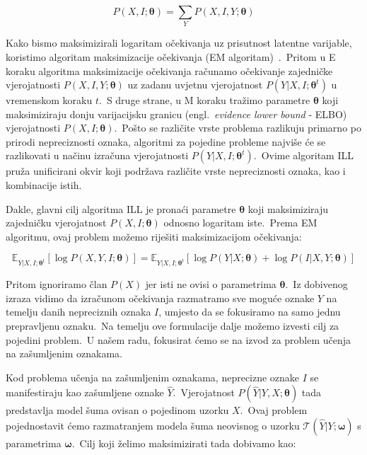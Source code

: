 \documentclass[diplomskirad]{fer}
\begin{document}
\begin{equation}
  P(X, I; \bm{\theta}) = \sum_{Y} P(X, I, Y; \bm{\theta})
  \label{eq:ill_joint}
\end{equation}

Kako bismo maksimizirali logaritam očekivanja uz prisutnost latentne varijable, koristimo algoritam maksimizacije očekivanja (EM algoritam)~\cite{moon1996expectation}.\
Pritom u E koraku algoritma maksimizacije očekivanja računamo očekivanje zajedničke vjerojatnosti $P(X, I, Y; \bm{\theta})$ uz zadanu uvjetnu vjerojatnost $P(Y | X, I; \bm{\theta}^t)$ u vremenskom koraku $t$.\ 
S druge strane, u M koraku tražimo parametre $\bm{\theta}$ koji maksimiziraju donju varijacijsku granicu (engl.\ \textit{evidence lower bound} - ELBO) vjerojatnosti $P(X, I; \bm{\theta})$.\ 
Pošto se različite vrste problema razlikuju primarno po prirodi nepreciznosti oznaka, algoritmi za pojedine probleme najviše će se razlikovati u načinu izračuna vjerojatnosti $P(Y | X, I; \bm{\theta}^t)$.\
Ovime algoritam ILL pruža unificirani okvir koji podržava različite vrste nepreciznosti oznaka, kao i kombinacije istih.\

Dakle, glavni cilj algoritma ILL je pronaći parametre $\bm{\theta}$ koji maksimiziraju zajedničku vjerojatnost $P(X, I; \bm{\theta})$ odnosno logaritam iste.\
Prema EM algoritmu, ovaj problem možemo riješiti maksimizacijom očekivanja:

\begin{equation}
  \mathbb{E}_{Y | X, I; \bm{\theta}^t} \left[ \log P(X, Y, I; \bm{\theta}) \right] = \mathbb{E}_{Y | X, I; \bm{\theta}^t} \left[ \log P(Y | X; \bm{\theta}) + \log P(I | X, Y; \bm{\theta}) \right]
  \label{eq:ill_expectation}
\end{equation}

\pagebreak

Pritom ignoriramo član $P(X)$ jer isti ne ovisi o parametrima $\bm{\theta}$.\ Iz dobivenog izraza vidimo da izračunom očekivanja razmatramo sve moguće oznake $Y$ na temelju danih nepreciznih oznaka $I$, umjesto da se fokusiramo na samo jednu prepravljenu oznaku.\
Na temelju ove formulacije dalje možemo izvesti cilj za pojedini problem.\ U našem radu, fokusirat ćemo se na izvod za problem učenja na zašumljenim oznakama.\ 

Kod problema učenja na zašumljenim oznakama, neprecizne oznake $I$ se manifestiraju kao zašumljene oznake $\hat{Y}$.\ 
Vjerojatnost $P(\hat{Y} | Y, X; \bm{\theta})$ tada predstavlja model šuma ovisan o pojedinom uzorku $X$.\ 
Ovaj problem pojednostavit ćemo razmatranjem modela šuma neovisnog o uzorku $\mathcal{T}(\hat{Y} | Y; \bm{\omega})$ s parametrima $\bm{\omega}$.\ Cilj koji želimo maksimizirati tada dobivamo kao:
\end{document}
